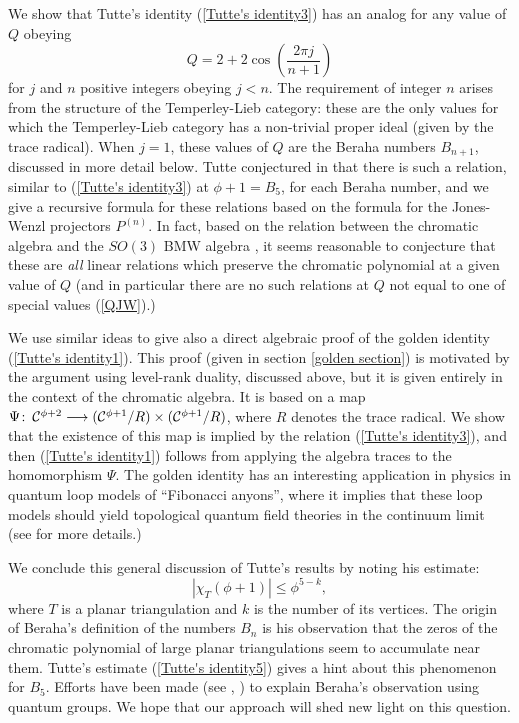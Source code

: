 \documentclass[11pt]{amsart}
\numberwithin{equation}{section}
\theoremstyle{definition}
\newcommand{\co}{\colon\thinspace}
\begin{document}
We show that Tutte's identity (\ref{Tutte's identity3}) has an analog
 for any value of $Q$ obeying
\begin{equation}
Q=2+2\cos\left(\frac{2\pi j}{n+1}\right)
\label{QJW}
\end{equation}
for $j$ and $n$ positive integers obeying $j< n$.  The requirement of
integer $n$ arises from the structure of the Temperley-Lieb category:
these are the only values for which the Temperley-Lieb category has a
non-trivial proper ideal (given by the trace radical). When $j=1$,
these values of $Q$ are the Beraha numbers $B_{n+1}$, discussed in
more detail below. Tutte conjectured in \cite{T3} that there is such a
relation, similar to (\ref{Tutte's identity3}) at ${\phi}+1=B_5$, for
each Beraha number, and we give a recursive formula for these
relations based on the formula for the Jones-Wenzl projectors
$P^{(n)}$.  In fact, based on the relation between the chromatic
algebra and the $SO(3)$ BMW algebra \cite{FK}, it seems reasonable to
conjecture that these are {\em all} linear relations which preserve
the chromatic polynomial at a given value of $Q$ (and in particular
there are no such relations at $Q$ not equal to one of special values
(\ref{QJW}).)


We use similar ideas to give also a direct algebraic proof of the golden
identity (\ref{Tutte's identity1}).
This proof (given in section \ref{golden section}) is motivated by the argument using
level-rank duality, discussed above,
but it is given entirely in the context of the chromatic algebra.
It is based on a map ${\Psi}\co
{\mathcal C}^{{\phi}+2}\longrightarrow ({\mathcal
C}^{{\phi}+1}/R)\times ({\mathcal C}^{{\phi}+1}/R)$, where $R$ denotes
the trace radical.  We show that the existence of this map is implied
by the relation (\ref{Tutte's identity3}), and then (\ref{Tutte's
identity1}) follows from applying the algebra traces to the
homomorphism ${\Psi}$.
The golden identity has an interesting application in physics in
quantum loop models of ``Fibonacci anyons'', where it implies that
these loop models should yield topological quantum field theories in
the continuum limit (see \cite{Fnew,FFNWW,Walker} for more details.)




We conclude this general discussion of Tutte's results by noting his estimate:
\begin{equation} \label{Tutte's identity5} |{\chi}^{}_T({\phi}+1)|\leq
{\phi}^{5-k},\end{equation} where $T$ is a planar triangulation and
$k$ is the number of its vertices. The origin of Beraha's definition
of the numbers $B_n$ is his observation \cite{Be} that the zeros of
the chromatic polynomial of large planar triangulations seem to
accumulate near them. Tutte's estimate (\ref{Tutte's identity5})
gives a hint about this phenomenon for $B_5$. Efforts have been made (see
\cite{KS}, \cite{S}) to explain Beraha's observation using quantum
groups. We hope that our approach will shed new light on this
question.
\end{document}
